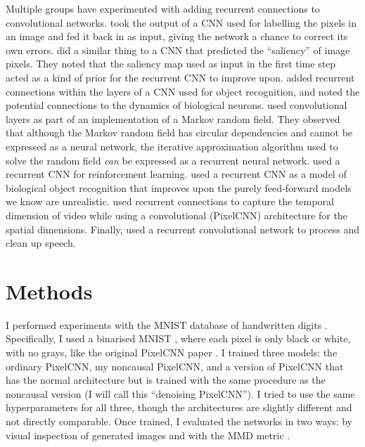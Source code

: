 \documentclass[11pt, a4paper, openany]{book}
\newcommand{\nquote}[1]{``{#1}''}
\begin{document}
Multiple groups have experimented with adding recurrent connections to convolutional networks. \citet{rcnnlabel} took the output of a CNN used for labelling the pixels in an image and fed it back in as input, giving the network a chance to correct its own errors. \citet{rcnnsaliency} did a similar thing to a CNN that predicted the \nquote{saliency} of image pixels. They noted that the saliency map used as input in the first time step acted as a kind of prior for the recurrent CNN to improve upon. \citet{rcnnobject} added recurrent connections within the layers of a CNN used for object recognition, and noted the potential connections to the dynamics of biological neurons. \citet{crfrcnn} used convolutional layers as part of an implementation of a Markov random field. They observed that although the Markov random field has circular dependencies and cannot be expressed as a neural network, the iterative approximation algorithm used to solve the random field \emph{can} be expressed as a recurrent neural network. \citet{rcnnreinforcement} used a recurrent CNN for reinforcement learning. \citet{rcnnbio} used a recurrent CNN as a model of biological object recognition that improves upon the purely feed-forward models we know are unrealistic. \citet{videopixel} used recurrent connections to capture the temporal dimension of video while using a convolutional (PixelCNN) architecture for the spatial dimensions. Finally, \citet{rcnnspeech} used a recurrent convolutional network to process and clean up speech.

\chapter{Methods}
\label{cha:methods}

I performed experiments with the MNIST database of handwritten digits \citep{mnist}. Specifically, I used a binarised MNIST \citep{binarisedmnist}, where each pixel is only black or white, with no grays, like the original PixelCNN paper \citep{pixelcnn1}. I trained three models: the ordinary PixelCNN, my noncausal PixelCNN, and a version of PixelCNN that has the normal architecture but is trained with the same procedure as the noncausal version (I will call this \nquote{denoising PixelCNN}). I tried to use the same hyperparameters for all three, though the architectures are slightly different and not directly comparable. Once trained, I evaluated the networks in two ways: by visual inspection of generated images and with the MMD metric \citep{mmd,ganmetrics}.
\end{document}
